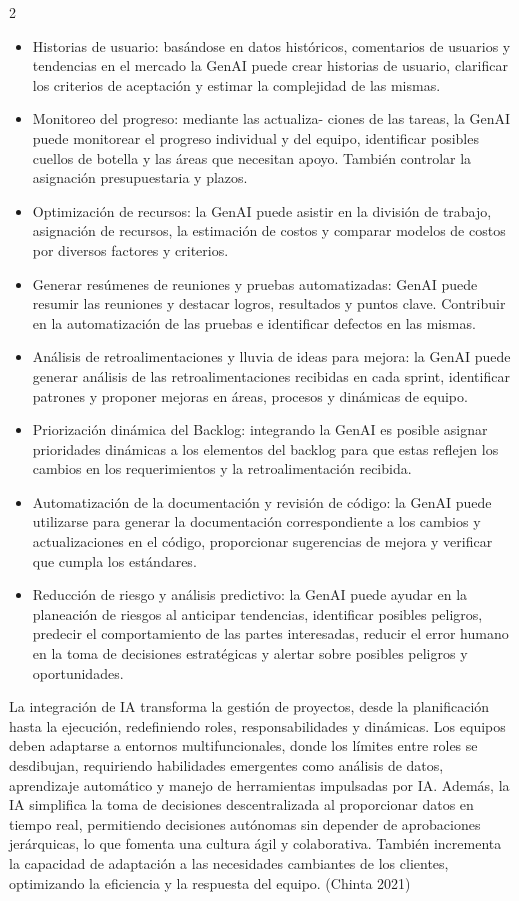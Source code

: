 \documentclass[12pt,spanish,Letterpaper,openany]{book}
\providecommand{\tightlist}{%
  \setlength{\itemsep}{0pt}\setlength{\parskip}{0pt}}
\begin{document}
\begin {multicols}{2}
\begin{itemize}
\tightlist
\item
  Historias de usuario: basándose en datos históricos, comentarios de usuarios y
  tendencias en el mercado la GenAI puede crear historias de usuario, clarificar los
  criterios de aceptación y estimar la complejidad de las mismas.
\item
  Monitoreo del progreso: mediante las actualiza-
  ciones de las tareas, la GenAI
  puede monitorear el progreso individual y del equipo, identificar posibles cuellos
  de botella y las áreas que necesitan apoyo. También controlar la asignación
  presupuestaria y plazos.
\item
  Optimización de recursos: la GenAI puede asistir en la división de trabajo,
  asignación de recursos, la estimación de costos y comparar modelos de costos por
  diversos factores y criterios.
\item
  Generar resúmenes de reuniones y pruebas automatizadas: GenAI puede resumir
  las reuniones y destacar logros, resultados y puntos clave. Contribuir en la
  automatización de las pruebas e identificar defectos en las mismas.
\item
  Análisis de retroalimentaciones y lluvia de ideas para mejora: la GenAI puede
  generar análisis de las retroalimentaciones recibidas en cada sprint, identificar
  patrones y proponer mejoras en áreas, procesos y dinámicas de equipo.
\item
  Priorización dinámica del Backlog: integrando la GenAI es posible asignar
  prioridades dinámicas a los elementos del backlog para que estas reflejen los
  cambios en los requerimientos y la retroalimentación recibida.
\item
  Automatización de la documentación y revisión de código: la GenAI puede
  utilizarse para generar la documentación correspondiente a los cambios y
  actualizaciones en el código, proporcionar sugerencias de mejora y verificar que
  cumpla los estándares.
\item
  Reducción de riesgo y análisis predictivo: la GenAI puede ayudar en la planeación
  de riesgos al anticipar tendencias, identificar posibles peligros, predecir el
  comportamiento de las partes interesadas, reducir el error humano en la toma de
  decisiones estratégicas y alertar sobre posibles peligros y oportunidades.
\end{itemize}

La integración de IA transforma la gestión de proyectos, desde la planificación hasta
la ejecución, redefiniendo roles, responsabilidades y dinámicas. Los equipos deben adaptarse
a entornos multifuncionales, donde los límites entre roles se desdibujan, requiriendo
habilidades emergentes como análisis de datos, aprendizaje automático y manejo de herramientas impulsadas por IA. Además, la IA simplifica la toma de decisiones
descentralizada al proporcionar datos en tiempo real, permitiendo decisiones autónomas sin
depender de aprobaciones jerárquicas, lo que fomenta una cultura ágil y colaborativa.
También incrementa la capacidad de adaptación a las necesidades cambiantes de los clientes,
optimizando la eficiencia y la respuesta del equipo. (Chinta 2021)


\end{multicols}
\end{document}
